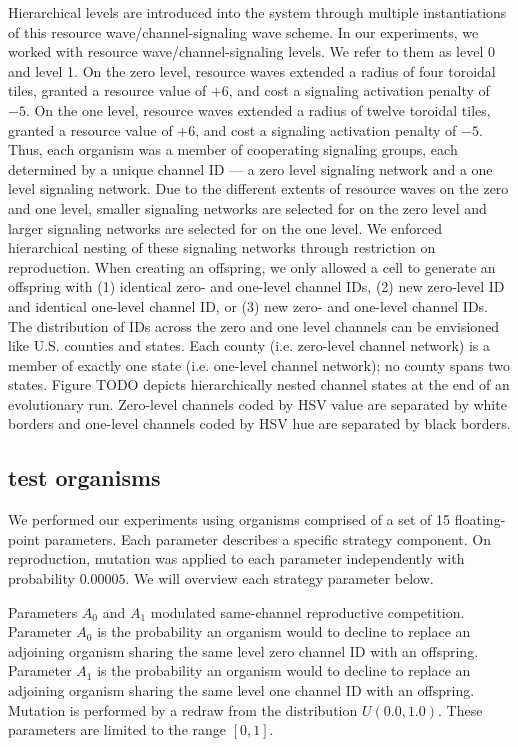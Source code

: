 Hierarchical levels are introduced into the system through multiple instantiations of this resource wave/channel-signaling wave scheme.
In our experiments, we worked with resource wave/channel-signaling levels.
We refer to them as level 0 and level 1.
On the zero level, resource waves extended a radius of four toroidal tiles, granted a resource value of $+6$, and cost a signaling activation penalty of $-5$.
On the one level, resource waves extended a radius of twelve toroidal tiles, granted a resource value of $+6$, and cost a signaling activation penalty of $-5$.
Thus, each organism was a member of cooperating signaling groups, each determined by a unique channel ID --- a zero level signaling network and a one level signaling network.
Due to the different extents of resource waves on the zero and one level, smaller signaling networks are selected for on the zero level and larger signaling networks are selected for on the one level.
We enforced hierarchical nesting of these signaling networks through restriction on reproduction.
When creating an offspring, we only allowed a cell to generate an offspring with (1) identical zero- and one-level channel IDs, (2) new zero-level ID and identical one-level channel ID, or (3) new zero- and one-level channel IDs.
The distribution of IDs across the zero and one level channels can be envisioned like U.S. counties and states.
Each county (i.e. zero-level channel network) is a member of exactly one state (i.e. one-level channel network);
no county spans two states.
Figure TODO depicts hierarchically nested channel states at the end of an evolutionary run.
Zero-level channels coded by HSV value are separated by white borders and one-level channels coded by HSV hue are separated by black borders.

\subsection{test organisms}

We performed our experiments using organisms comprised of a set of 15 floating-point parameters.
Each parameter describes a specific strategy component.
On reproduction, mutation was applied to each parameter independently with probability $0.00005$.
We will overview each strategy parameter below.

Parameters $A_0$ and $A_1$ modulated same-channel reproductive competition.
Parameter $A_0$ is the probability an organism would to decline to replace an adjoining organism sharing the same level zero channel ID with an offspring.
Parameter $A_1$ is the probability an organism would to decline to replace an adjoining organism sharing the same level one channel ID with an offspring.
Mutation is performed by a redraw from the distribution $U(0.0,1.0)$.
These parameters are limited to the range $[0,1]$.

